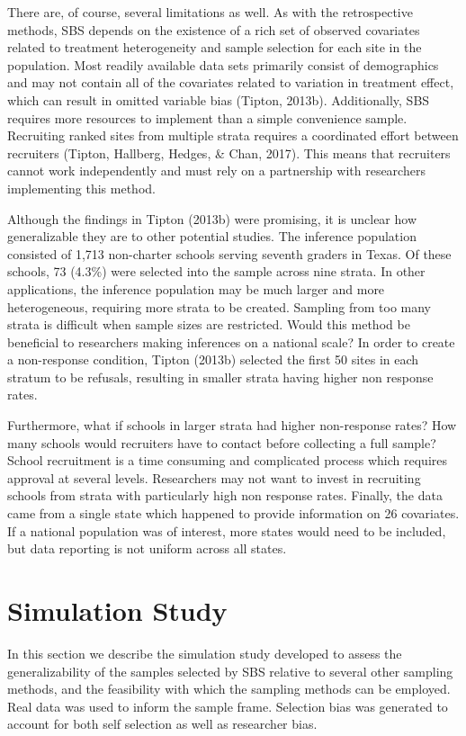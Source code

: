\documentclass[man,floatsintext]{apa6}
\begin{document}
There are, of course, several limitations as well. As with the retrospective methods, SBS depends on the existence of a rich set of observed covariates related to treatment heterogeneity and sample selection for each site in the population. Most readily available data sets primarily consist of demographics and may not contain all of the covariates related to variation in treatment effect, which can result in omitted variable bias (Tipton, 2013b). Additionally, SBS requires more resources to implement than a simple convenience sample. Recruiting ranked sites from multiple strata requires a coordinated effort between recruiters (Tipton, Hallberg, Hedges, \& Chan, 2017). This means that recruiters cannot work independently and must rely on a partnership with researchers implementing this method.

Although the findings in Tipton (2013b) were promising, it is unclear how generalizable they are to other potential studies. The inference population consisted of 1,713 non-charter schools serving seventh graders in Texas. Of these schools, 73 (4.3\%) were selected into the sample across nine strata. In other applications, the inference population may be much larger and more heterogeneous, requiring more strata to be created. Sampling from too many strata is difficult when sample sizes are restricted. Would this method be beneficial to researchers making inferences on a national scale? In order to create a non-response condition, Tipton (2013b) selected the first 50 sites in each stratum to be refusals, resulting in smaller strata having higher non response rates.

Furthermore, what if schools in larger strata had higher non-response rates? How many schools would recruiters have to contact before collecting a full sample? School recruitment is a time consuming and complicated process which requires approval at several levels. Researchers may not want to invest in recruiting schools from strata with particularly high non response rates. Finally, the data came from a single state which happened to provide information on 26 covariates. If a national population was of interest, more states would need to be included, but data reporting is not uniform across all states.

\hypertarget{simulation-study}{%
\section{Simulation Study}\label{simulation-study}}

In this section we describe the simulation study developed to assess the generalizability of the samples selected by SBS relative to several other sampling methods, and the feasibility with which the sampling methods can be employed. Real data was used to inform the sample frame.
Selection bias was generated to account for both self selection as well as researcher bias.
\end{document}
